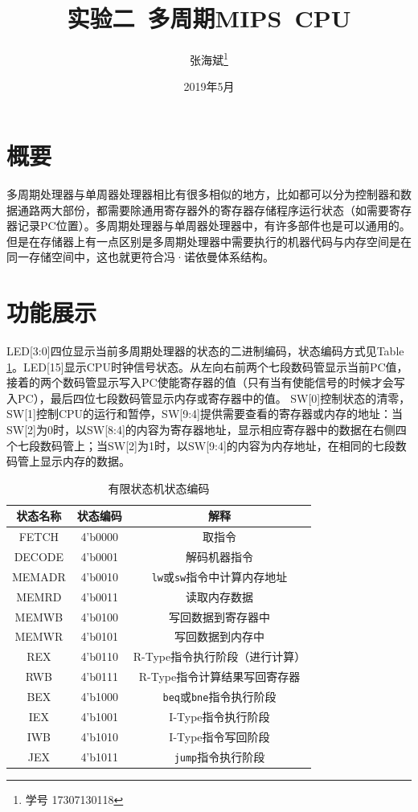 \documentclass[12pt,a4paper]{article}
\title{实验二~多周期MIPS~CPU}
\author{张海斌\thanks{学号 17307130118}}
\newcommand{\incode}[1]{\texttt{#1}} %
\begin{document}
\date{2019年5月}

\maketitle

\renewcommand\contentsname{目~录}
\tableofcontents

\section{概要}

多周期处理器与单周器处理器相比有很多相似的地方，比如都可以分为控制器和数据通路两大部份，都需要除通用寄存器外的寄存器存储程序运行状态（如需要寄存器记录PC位置）。多周期处理器与单周器处理器中，有许多部件也是可以通用的。但是在存储器上有一点区别是多周期处理器中需要执行的机器代码与内存空间是在同一存储空间中，这也就更符合冯·诺依曼体系结构。

\section{功能展示}

LED[3:0]四位显示当前多周期处理器的状态的二进制编码，状态编码方式见Table \ref{table:state}。LED[15]显示CPU时钟信号状态。从左向右前两个七段数码管显示当前PC值，接着的两个数码管显示写入PC使能寄存器的值（只有当有使能信号的时候才会写入PC），最后四位七段数码管显示内存或寄存器中的值。
SW[0]控制状态的清零，SW[1]控制CPU的运行和暂停，SW[9:4]提供需要查看的寄存器或内存的地址：当SW[2]为0时，以SW[8:4]的内容为寄存器地址，显示相应寄存器中的数据在右侧四个七段数码管上；当SW[2]为1时，以SW[9:4]的内容为内存地址，在相同的七段数码管上显示内存的数据。

\begin{table}
	\centering
	\begin{tabular}{|c|c|c|}
		\hline
		状态名称 & 状态编码 & 解释\\
		\hline
		FETCH    &  4'b0000 & 取指令\\
		DECODE   &  4'b0001 & 解码机器指令\\
		MEMADR   &  4'b0010 & \incode{lw}或\incode{sw}指令中计算内存地址\\
		MEMRD    &  4'b0011 & 读取内存数据\\
		MEMWB    &  4'b0100 & 写回数据到寄存器中\\
		MEMWR    &  4'b0101 & 写回数据到内存中\\
		REX      &  4'b0110 & R-Type指令执行阶段（进行计算）\\
		RWB      &  4'b0111 & R-Type指令计算结果写回寄存器\\
		BEX      &  4'b1000 & \incode{beq}或\incode{bne}指令执行阶段\\
		IEX      &  4'b1001 & I-Type指令执行阶段\\
		IWB      &  4'b1010 & I-Type指令写回阶段\\
		JEX      &  4'b1011 & \incode{jump}指令执行阶段\\
		\hline
	\end{tabular}
	\caption{有限状态机状态编码}
	\label{table:state}
\end{table}
\end{document}
